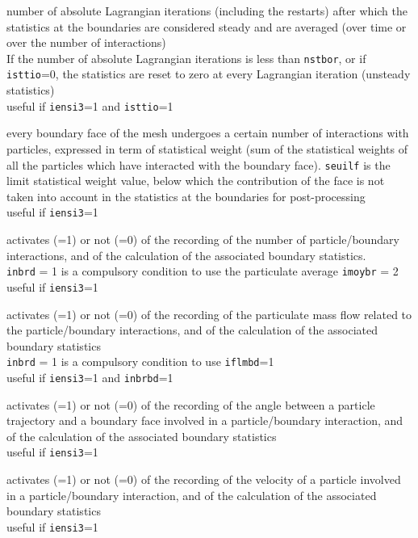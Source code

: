 {number of absolute Lagrangian iterations (including the restarts)
after which the statistics at the boundaries are considered steady and are
averaged (over time or over the number of interactions)\\
If the number of absolute Lagrangian iterations is less than \texttt{nstbor},
or if \texttt{isttio}=0, the statistics are reset to zero at every
Lagrangian iteration (unsteady statistics)\\
useful if \texttt{iensi3}=1 and \texttt{isttio}=1}

{every boundary face of the mesh undergoes a certain number of
interactions with particles, expressed in term of statistical weight
(sum of the statistical weights of all the particles which have
interacted with the boundary face). \texttt{seuilf} is
the limit statistical weight value, below which the contribution of the
face is not taken into account in the
statistics at the boundaries for post-processing\\
useful if \texttt{iensi3}=1}

{activates (=1) or not (=0) of the recording of the number of particle/boundary
interactions, and of the calculation of the associated boundary statistics.\\
\texttt{inbrd} = 1 is a compulsory condition to use the particulate average
\texttt{imoybr} = 2\\
useful if \texttt{iensi3}=1}

{activates (=1) or not (=0) of the recording of the particulate mass flow
related to the particle/boundary interactions, and of the calculation of
the associated boundary statistics\\
\texttt{inbrd} = 1 is a compulsory condition to use \texttt{iflmbd}=1\\
useful if \texttt{iensi3}=1 and \texttt{inbrbd}=1}


{activates (=1) or not (=0) of the recording of the angle between a
particle trajectory and a boundary face involved in a particle/boundary
interaction, and of the calculation of the associated boundary statistics\\
useful if \texttt{iensi3}=1}

{activates (=1) or not (=0) of the recording of the velocity of a particle
involved in a particle/boundary interaction, and of the calculation of
the associated boundary statistics\\
useful if \texttt{iensi3}=1}

